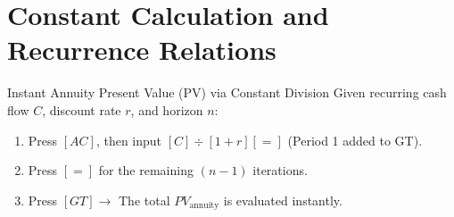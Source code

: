 \section{Constant Calculation and Recurrence Relations}


\begin{calcbox}{Instant Annuity Present Value (PV) via Constant Division}
Given recurring cash flow $C$, discount rate $r$, and horizon $n$:
\begin{enumerate}
    \item Press $[AC]$, then input $[C] \div [1 + r] [=]$ (Period 1 added to GT).
    \item Press $[=]$ for the remaining $(n-1)$ iterations.
    \item Press $[GT] \to$ The total $PV_{\text{annuity}}$ is evaluated instantly.
\end{enumerate}
\end{calcbox}
\fi
